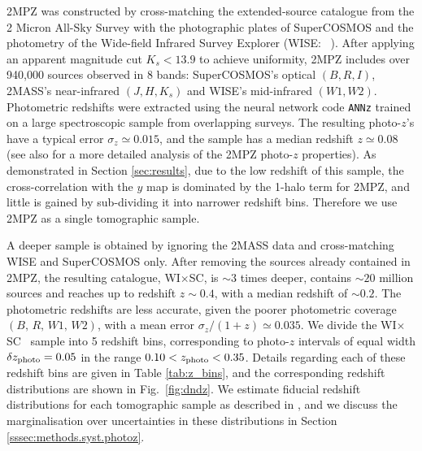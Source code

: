 \documentclass[useAMS,usenatbib]{mn2e}
\newcommand{\wisc}{WI$\times$SC}
\def\citejap#1{\citeauthor{#1}\ \citeyear{#1}}
\begin{document}
    2MPZ was constructed by cross-matching the extended-source catalogue from the 2 Micron All-Sky Survey \citep[2MASS,][]{2006AJ....131.1163S,2000AJ....119.2498J} with the photographic plates of SuperCOSMOS \citep{2001MNRAS.326.1295H,2016MNRAS.462.2085P} and the photometry of the Wide-field Infrared Survey Explorer (WISE: \citejap{2010AJ....140.1868W}). After applying an apparent magnitude cut $K_s<13.9$ to achieve uniformity, 2MPZ includes over 940,000 sources observed in 8 bands: SuperCOSMOS's optical $(B,R,I)$, 2MASS's near-infrared $(J,H,K_s)$ and WISE's mid-infrared $(W1,W2)$. Photometric redshifts were extracted using the neural network code {\tt ANNz} \citep{2004PASP..116..345C} trained on a large spectroscopic sample from overlapping surveys. The resulting photo-$z$'s have a typical error $\sigma_z\simeq0.015$, and the sample has a median redshift $z\simeq0.08$ (see also \citealt{2018MNRAS.476.1050B} for a more detailed analysis of the 2MPZ photo-$z$ properties). As demonstrated in Section \ref{sec:results}, due to the low redshift of this sample, the cross-correlation with the $y$ map is dominated by the 1-halo term for 2MPZ, and little is gained by sub-dividing it into narrower redshift bins. Therefore we use 2MPZ as a single tomographic sample.
    
    A deeper sample is obtained by ignoring the 2MASS data and cross-matching WISE and SuperCOSMOS only. After removing the sources already contained in 2MPZ, the resulting catalogue, \wisc, is $\sim3$ times deeper, contains $\sim20$ million sources and reaches up to redshift $z\sim0.4$, with a median redshift of $\sim0.2$. The photometric redshifts are less accurate, given the poorer photometric coverage $(B,\,R,\,W1,\,W2)$, with a mean error $\sigma_z/(1+z)\simeq0.035$. We divide the \wisc~ sample into 5 redshift bins, corresponding to photo-$z$ intervals of equal width $\delta z_{\rm photo}=0.05$ in the range $0.10<z_{\rm photo}<0.35$. Details regarding each of these redshift bins are given in Table \ref{tab:z_bins}, and the corresponding redshift distributions are shown in Fig.\!~\ref{fig:dndz}. We estimate fiducial redshift distributions for each tomographic sample as described in \cite{2018MNRAS.481.1133P}, and we discuss the marginalisation over uncertainties in these distributions in Section \ref{sssec:methods.syst.photoz}.
\end{document}
